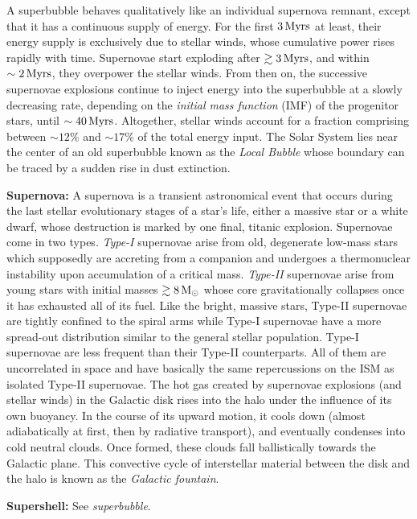 \documentclass[a4paper,10pt]{article}
\begin{document}
A superbubble behaves qualitatively like an individual supernova remnant, except that it has a continuous supply of energy. For the first $3\,{\rm Myrs}$ at least, their energy supply is exclusively due to stellar winds, whose cumulative power rises rapidly with time. Supernovae start exploding after $\gtrsim3\,{\rm Myrs}$, and within $\sim2\,{\rm Myrs}$, they overpower the stellar winds. From then on, the successive supernovae explosions continue to inject energy into the superbubble at a slowly decreasing rate, depending on the \textit{initial mass function} (IMF) of the progenitor stars, until $\sim40\,{\rm Myrs}$. Altogether, stellar winds account for a fraction comprising between $\sim12\%$ and $\sim17\%$ of the total energy input. The Solar System lies near the center of an old superbubble known as the \textit{Local Bubble} whose boundary can be traced by a sudden rise in dust extinction.

{\noindent}\textbf{Supernova:} A supernova is a transient astronomical event that occurs during the last stellar evolutionary stages of a star's life, either a massive star or a white dwarf, whose destruction is marked by one final, titanic explosion. Supernovae come in two types. \textit{Type-I} supernovae arise from old, degenerate low-mass stars which supposedly are accreting from a companion and undergoes a thermonuclear instability upon accumulation of a critical mass. \textit{Type-II} supernovae arise from young stars with initial masses $\gtrsim8\,{\rm M}_\odot$ whose core gravitationally collapses once it has exhausted all of its fuel. Like the bright, massive stars, Type-II supernovae are tightly confined to the spiral arms while Type-I supernovae have a more spread-out distribution similar to the general stellar population. Type-I supernovae are less frequent than their Type-II counterparts. All of them are uncorrelated in space and have basically the same repercussions on the ISM as isolated Type-II supernovae. The hot gas created by supernovae explosions (and stellar winds) in the Galactic disk rises into the halo under the influence of its own buoyancy. In the course of its upward motion, it cools down (almost adiabatically at first, then by radiative transport), and eventually condenses into cold neutral clouds. Once formed, these clouds fall ballistically towards the Galactic plane. This convective cycle of interstellar material between the disk and the halo is known as the \textit{Galactic fountain}.

{\noindent}\textbf{Supershell:} See \textit{superbubble}.
\end{document}
